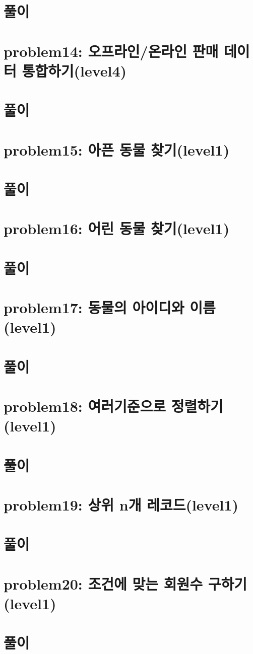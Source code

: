 \documentclass[11pt]{article}
\begin{document}
\section*{풀이}
\label{sec:org050f148}

\section*{problem14: 오프라인/온라인 판매 데이터 통합하기(level4)}
\label{sec:orgec782b1}
\section*{풀이}
\label{sec:orga08779d}

\section*{problem15: 아픈 동물 찾기(level1)}
\label{sec:org026def9}
\section*{풀이}
\label{sec:org91b5bfe}

\section*{problem16: 어린 동물 찾기(level1)}
\label{sec:org8bc9132}
\section*{풀이}
\label{sec:org6cfc858}

\section*{problem17: 동물의 아이디와 이름(level1)}
\label{sec:org5c0ddf8}
\section*{풀이}
\label{sec:org789fe85}

\section*{problem18: 여러기준으로 정렬하기(level1)}
\label{sec:org6428a00}
\section*{풀이}
\label{sec:org0e2c5d3}

\section*{problem19: 상위 n개 레코드(level1)}
\label{sec:org8187e21}
\section*{풀이}
\label{sec:org99a6d70}

\section*{problem20: 조건에 맞는 회원수 구하기(level1)}
\label{sec:org18b4e3c}
\section*{풀이}
\label{sec:orgf7050fa}
\end{document}
